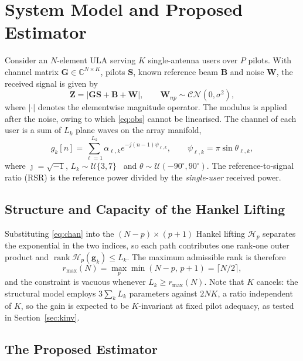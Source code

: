 \documentclass[journal]{IEEEtran}
\DeclareMathOperator{\rank}{rank}
\newcommand{\bG}{\mathbf{G}}
\newcommand{\bS}{\mathbf{S}}
\newcommand{\bB}{\mathbf{B}}
\newcommand{\bW}{\mathbf{W}}
\newcommand{\bZ}{\mathbf{Z}}
\newcommand{\bg}{\mathbf{g}}
\newcommand{\CN}{\mathcal{CN}}
\newcommand{\Hank}{\mathcal{H}}
\newcommand{\rmax}{r_{\max}}
\begin{document}
\section{System Model and Proposed Estimator}
\label{sec:method}

Consider an $N$-element ULA serving $K$ single-antenna users over $P$ pilots.
With channel matrix $\bG\in\mathbb{C}^{N\times K}$, pilots $\bS$, known reference
beam $\bB$ and noise $\bW$, the received signal is given by
\begin{equation}
\bZ=\left|\bG\bS+\bB+\bW\right|,\qquad \bW_{np}\sim\CN(0,\sigma^2),
\label{eq:obs}
\end{equation}
where $|\cdot|$ denotes the elementwise magnitude operator. The modulus is
applied after the noise, owing to which \eqref{eq:obs} cannot be linearised. The
channel of each user is a sum of $L_k$ plane waves on the array manifold,
\begin{equation}
g_k[n]=\sum_{\ell=1}^{L_k}\alpha_{\ell,k}e^{-j(n-1)\psi_{\ell,k}},\qquad
\psi_{\ell,k}=\pi\sin\theta_{\ell,k},
\label{eq:chan}
\end{equation}
where $\jmath=\sqrt{-1}$, $L_k\sim\mathcal{U}\{3,7\}$~\cite{xu2025} and
$\theta\sim\mathcal{U}(-90^\circ,90^\circ)$. The reference-to-signal ratio (RSR)
is the reference power divided by the \emph{single-user} received power.

\subsection{Structure and Capacity of the Hankel Lifting}

Substituting \eqref{eq:chan} into the $(N-p)\times(p+1)$ Hankel lifting
$\Hank_p$ separates the exponential in the two indices, so each path contributes
one rank-one outer product and $\rank\Hank_p(\bg_k)\le L_k$. The maximum
admissible rank is therefore
\begin{equation}
\rmax(N)=\max_p\min(N-p,\,p+1)=\lceil N/2\rceil,
\label{eq:cap}
\end{equation}
and the constraint is vacuous whenever $L_k\ge\rmax(N)$. Note that $K$ cancels:
the structural model employs $3\sum_k L_k$ parameters against $2NK$, a ratio
independent of $K$, so the gain is expected to be $K$-invariant at fixed pilot
adequacy, as tested in Section~\ref{sec:kinv}.

\subsection{The Proposed Estimator}
\end{document}

